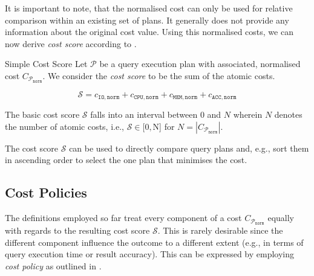 It is important to note, that the normalised cost can only be used for relative comparison within an existing set of plans. It generally does not provide any information about the original cost value. Using this normalised costs, we can now derive \emph{cost score} according to .

\begin{definition}[label=definition:cost_score]{Simple Cost Score}{}
    Let $\mathcal{P}$  be a query execution plan with associated, normalised cost $C_{\mathcal{P}_{\mathtt{norm}}}$. We consider the \emph{cost score} to be the sum of the atomic costs.

    \begin{equation*}
        \mathcal{S} = c_{\mathtt{IO},\mathtt{norm}} + c_{\mathtt{CPU},\mathtt{norm}} + c_{\mathtt{MEM},\mathtt{norm}} + c_{\mathtt{ACC},\mathtt{norm}}
    \end{equation*}

    The basic cost score $ \mathcal{S}$ falls into an interval between $0$ and $N$ wherein $N$ denotes the number of atomic costs, i.e., $\mathcal{S} \in [0, $N] for $N = |C_{\mathcal{P}_{\mathtt{norm}}}|$.
\end{definition}

The cost score $\mathcal{S}$ can be used to directly compare query plans and, e.g., sort them in ascending order to select the one plan that minimises the cost.

\subsection{Cost Policies}

The definitions employed so far treat every component of a cost $C_{\mathcal{P}_{\mathtt{norm}}}$ equally with regards to the resulting cost score $\mathcal{S}$. This is rarely desirable since the different component influence the outcome to a different extent (e.g., in terms of query execution time or result accuracy). This can be expressed by employing \emph{cost policy} as outlined in .


